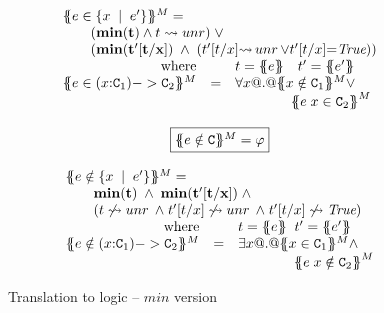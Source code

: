 \documentclass[preprint]{sigplanconf}
\begin{document}
\begin{figure}
\[\begin{array}{c}
\begin{array}{rcl}
\multicolumn{3}{l}{\ctrans{\Sigma}{\Gamma}{e \in \{x\;\mid\;e' \}}^M = }\\
\multicolumn{3}{l}{  \qquad ({\bf min(t)} \land t\red\unr)\;\lor} \\ 
\multicolumn{3}{l}{  \qquad({\bf min(t'[t/x])}\;\land\; (t'[t/x]{\red}\unr \lor t'[t/x]{=}\True))} \\
  \mbox{where} & &
      t = \etrans{\Sigma}{\Gamma}{e} \quad t' = \etrans{\Sigma}{\Gamma}{e'}
\\
\ctrans{\Sigma}{\Gamma}{e \in (x{:}\Ct_1) -> \Ct_2}^M
  & = & \formula{\forall x @.@ \ctrans{\Sigma}{\Gamma,x}{x \notin \Ct_1}^M \lor} \\
  &   & \qquad\qquad \formula{\ctrans{\Sigma}{\Gamma,x}{e\;x \in \Ct_2}}^M
\end{array}
\\ \\
\ruleform{\ctrans{\Sigma}{\Gamma}{e \notin \Ct}^M = \formula{\phi}} \\ \\
\begin{array}{rcl}
\multicolumn{3}{l}{ \ctrans{\Sigma}{\Gamma}{e \notin \{x\;\mid\;e' \}}^M = } \\ 
\multicolumn{3}{l}{ \qquad {\bf min(t)\;\land\; min(t'[t/x])}\;\land} \\ 
\multicolumn{3}{l}{ \qquad (\formula{t \not \red \unr\;\land\; t'[t/x] \not\red \unr \;\land\; t'[t/x] \not\red \True})} \\
  \mbox{where} & & 
      t= \etrans{\Sigma}{\Gamma}{e} \;\; t' = \etrans{\Sigma}{\Gamma}{e'}
\\
\ctrans{\Sigma}{\Gamma}{e \notin (x{:}\Ct_1) -> \Ct_2}^M
  & = & \formula{\exists x @.@ \ctrans{\Sigma}{\Gamma,x}{x \in \Ct_1}^M \land} \\
  &   & \qquad\qquad \formula{\ctrans{\Sigma}{\Gamma,x}{e\;x \notin \Ct_2}}^M
\end{array}
\end{array}\]
\caption{Translation to logic -- $min$ version}
   \label{fig:min-etrans}\label{fig:contracts-minfull}
\end{figure}
\end{document}

